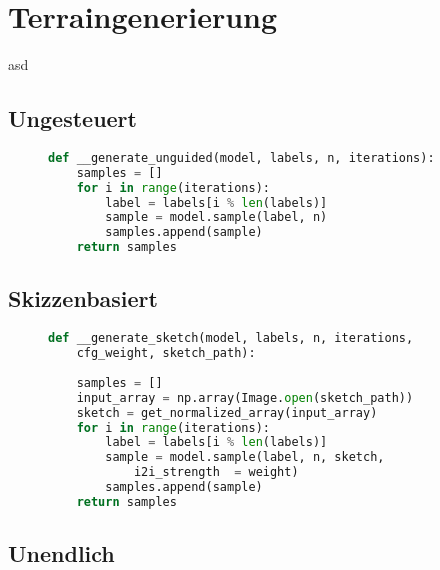 \section {Terraingenerierung}

asd

\subsection {Ungesteuert}


\begin{figure}[htbp]
\begin{lstlisting}[language=python]
def __generate_unguided(model, labels, n, iterations):
    samples = []
    for i in range(iterations):
        label = labels[i % len(labels)]
        sample = model.sample(label, n)
        samples.append(sample)
    return samples
\end{lstlisting}
    \captionsetup{type=figure}
    \label{fig:gen_unguided}
\end{figure}


\subsection {Skizzenbasiert}

\begin{figure}[htbp]
\begin{lstlisting}[language=python]
def __generate_sketch(model, labels, n, iterations,
    cfg_weight, sketch_path):
    
    samples = []
    input_array = np.array(Image.open(sketch_path))
    sketch = get_normalized_array(input_array)
    for i in range(iterations):
        label = labels[i % len(labels)]
        sample = model.sample(label, n, sketch,
            i2i_strength  = weight)
        samples.append(sample)
    return samples
\end{lstlisting}
    \captionsetup{type=figure}
    \label{fig:gen_sketch}
\end{figure}

\subsection {Unendlich}

